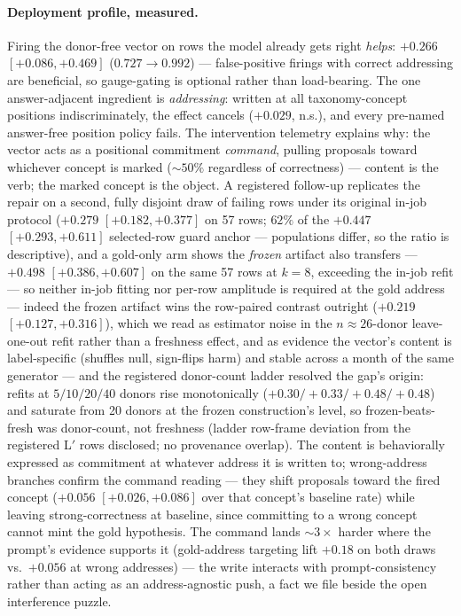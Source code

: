 \documentclass{article} %
\begin{document}
\paragraph{Deployment profile, measured.} Firing the donor-free vector
on rows the model already gets right \emph{helps}: $+0.266$
$[+0.086, +0.469]$ ($0.727 \to 0.992$) --- false-positive firings with
correct addressing are beneficial, so gauge-gating is optional rather
than load-bearing. The one answer-adjacent ingredient is
\emph{addressing}: written at all taxonomy-concept positions
indiscriminately, the effect cancels ($+0.029$, n.s.), and every
pre-named answer-free position policy fails. The intervention
telemetry explains why: the vector acts as a positional commitment
\emph{command}, pulling proposals toward whichever concept is marked
(${\sim}50\%$ regardless of correctness) --- content is the verb; the
marked concept is the object. A registered follow-up replicates the
repair on a second, fully
disjoint draw of failing rows under its original in-job protocol
($+0.279$
$[+0.182, +0.377]$ on 57 rows; $62\%$ of the $+0.447$
$[+0.293, +0.611]$ selected-row guard anchor --- populations differ,
so the ratio is descriptive), and a gold-only arm shows the
\emph{frozen} artifact also transfers --- $+0.498$ $[+0.386, +0.607]$
on the same 57 rows at $k{=}8$, exceeding the in-job refit --- so
neither in-job fitting nor per-row amplitude is required at the
gold address --- indeed the frozen artifact wins the row-paired
contrast outright ($+0.219$ $[+0.127, +0.316]$), which we read as
estimator noise in the $n{\approx}26$-donor leave-one-out refit
rather than a freshness effect, and as evidence the vector's content
is label-specific (shuffles null, sign-flips harm) and stable
across a month of the same generator --- and the registered
donor-count ladder resolved the gap's origin: refits at
$5/10/20/40$ donors rise monotonically ($+0.30/+0.33/+0.48/+0.48$)
and saturate from 20 donors at the frozen construction's level, so
frozen-beats-fresh was donor-count, not freshness (ladder row-frame
deviation from the registered L$'$ rows disclosed; no provenance
overlap). The content is behaviorally expressed as
commitment at whatever address it is written to; wrong-address
branches confirm the command reading --- they shift proposals toward
the fired concept ($+0.056$ $[+0.026, +0.086]$ over that concept's
baseline rate) while leaving strong-correctness at baseline, since
committing to a wrong concept cannot mint the gold hypothesis. The
command lands $\sim 3\times$ harder where the prompt's evidence
supports it (gold-address targeting lift $+0.18$ on both draws vs.\
$+0.056$ at wrong addresses) --- the write interacts with
prompt-consistency rather than acting as an address-agnostic push, a
fact we file beside the open interference puzzle.
\end{document}
